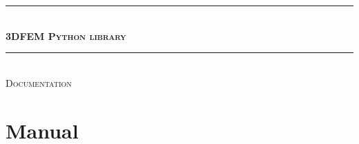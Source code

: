 \documentclass[12pt, openany]{report}
\newcommand{\HRule}{\rule{\linewidth}{0.5mm}}
\begin{document}
\begin{titlepage}
  \begin{sffamily}
  \begin{center}



    \HRule \\[0.4cm]
    { \huge \bfseries \textsc{3DFEM Python library}\\[0.4cm] }
    \HRule \\[0.5cm]
    
    \textsc{\Large Documentation}\\[1.8cm]
    



    \vfill

    
  \end{center}
  \end{sffamily}
\end{titlepage}

\tableofcontents

\chapter{Manual}
\end{document}
